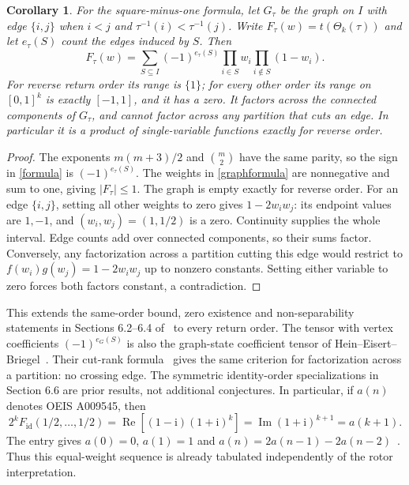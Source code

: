 \documentclass[11pt]{article}
\newtheorem{corollary}[theorem]{Corollary}
\begin{document}
\begin{corollary}\label{graph}
For the square-minus-one formula, let $G_\tau$ be the graph on $I$ with
edge $\{i,j\}$ when $i<j$ and $\tau^{-1}(i)<\tau^{-1}(j)$.
Write $F_\tau(w)=t(\Theta_k(\tau))$ and let $e_\tau(S)$ count the
edges induced by $S$. Then
\begin{equation}\label{graphformula}
F_\tau(w)=\sum_{S\subseteq I}(-1)^{e_\tau(S)}
       \prod_{i\in S}w_i\prod_{i\notin S}(1-w_i).
\end{equation}
For reverse return order its range is $\{1\}$; for every other order
its range on $[0,1]^k$ is exactly $[-1,1]$, and it has a zero.
It factors across the connected components of $G_\tau$, and cannot
factor across any partition that cuts an edge. In particular it is a
product of single-variable functions exactly for reverse order.
\end{corollary}
\begin{proof}
The exponents $m(m+3)/2$ and $\binom m2$ have the same parity,
so the sign in \eqref{formula} is $(-1)^{e_\tau(S)}$.
The weights in \eqref{graphformula} are nonnegative and sum to one,
giving $|F_\tau|\leq1$. The graph is empty exactly for reverse order.
For an edge $\{i,j\}$, setting all other weights to zero gives
$1-2w_iw_j$: its endpoint values are $1,-1$, and
$(w_i,w_j)=(1,1/2)$ is a zero. Continuity supplies the whole interval.
Edge counts add over connected components, so their sums factor.
Conversely, any factorization across a partition cutting this edge
would restrict to $f(w_i)g(w_j)=1-2w_iw_j$ up to nonzero constants.
Setting either variable to zero forces both factors constant, a contradiction.
\end{proof}
This extends the same-order bound, zero existence and non-separability
statements in Sections 6.2--6.4 of~\cite{Jenzer} to every return order.
The tensor with vertex coefficients $(-1)^{e_G(S)}$ is also the
graph-state coefficient tensor of Hein--Eisert--Briegel~\cite[arXiv v1, Eqs.~(8)--(9)]{HEB}.
Their cut-rank formula~\cite[arXiv v1, Proposition 3, Eq.~(42)]{HEB} gives the
same criterion for factorization across a partition: no crossing edge.
The symmetric identity-order specializations in Section 6.6 are prior
results, not additional conjectures. In particular, if $a(n)$ denotes
OEIS A009545, then
\[
2^kF_{\mathrm{id}}(1/2,\ldots,1/2)
=\operatorname{Re}[(1-\mathrm i)(1+\mathrm i)^k]
=\operatorname{Im}(1+\mathrm i)^{k+1}=a(k+1).
\]
The entry gives $a(0)=0$, $a(1)=1$ and
$a(n)=2a(n-1)-2a(n-2)$~\cite{OEIS}. Thus this equal-weight sequence
is already tabulated independently of the rotor interpretation.
\end{document}
